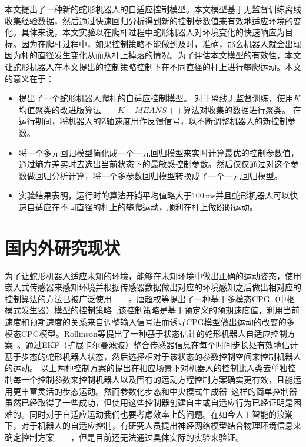 本文提出了一种新的蛇形机器人的自适应控制模型。本文模型基于无监督训练离线收集经验数据，然后通过快速回归分析得到新的控制参数值来有效地适应环境的变化。具体来说，本文实验以在爬杆过程中蛇形机器人对环境变化的快速响应为目标。因为在爬杆过程中，如果控制策略不能做到及时，准确，那么机器人就会出现因为杆的直径发生变化从而从杆上掉落的情况。为了评估本文模型的有效性，本文让蛇形机器人在本文提出的控制策略控制下在不同直径的杆上进行攀爬运动。本文的意义在于：
\begin{itemize}
	\item 提出了一个蛇形机器人爬杆的自适应控制模型。 对于离线无监督训练，使用$K$均值聚类的改进版算法——$K-MEANS++$算法对收集的数据进行聚类。 在运行期间，将机器人的Z轴速度用作反馈信号，以不断调整机器人的新控制参数。
	\item 将一个多元回归模型简化成一个一元回归模型来实时计算最优的控制参数值，通过熵方差实时去选出当前状态下的最敏感控制参数。然后仅仅通过对这个参数做回归分析计算，将一个多参数回归模型转换成了一个一元回归模型。
	\item 实验结果表明，运行时的算法开销平均值略大于100\,ms并且蛇形机器人可以快速自适应在不同直径的杆上的攀爬运动，顺利在杆上做盼盼运动。
\end{itemize}

\section{国内外研究现状}
\label{sec:related_work}

为了让蛇形机器人适应未知的环境，能够在未知环境中做出正确的运动姿态，使用嵌入式传感器来感知环境并根据传感器数据做出对应的环境感知之后做出相对应的控制算法的方法已被广泛使用~\cite{BalancingAndControl}~\cite{FeedbackControlOfSoft}~\cite{CPGenabling}~\cite{GaitBasedCompliant}。唐超权等提出了一种基于多模态CPG（中枢模式发生器）模型的控制策略~\cite{CPGenabling},该控制策略是基于预定义的预期速度值，利用当前速度和预期速度的关系来自调整输入信号进而诱导CPG模型做出运动的改变的多模态CPG模型。Rollinson等提出了一种基于状态估计的蛇形机器人自适应控制方案~\cite{GaitBasedCompliant}。通过EKF（扩展卡尔曼滤波）整合传感器信息在每个时间步长处有效地估计基于步态的蛇形机器人状态，然后选择相对于该状态的参数控制空间来控制机器人的运动。 以上两种控制方案的提出在相应场景下对机器人的控制比人类去单独控制每一个控制参数来控制机器人以及固有的运动方程控制方案确实更有效，且能运用更丰富灵活的步态运动。然而参数化步态和中央模式生成器~\cite{ijspeert2008central}这样的简单控制器虽然已经取得了一些成功，但使用这些控制器创建自主或自适应行为已经证明是困难的。同时对于自适应运动我们也要考虑效率上的问题。在如今人工智能的浪潮下，对于机器人的自适应控制，有研究人员提出神经网络模型结合物理环境信息来确定控制方案~\cite{InformationDriven}~\cite{NovelPlasticityRule}~\cite{MissileSystems}~\cite{NeuroFuzzyBayesian}，但是目前还无法通过具体实际的实验来验证。


